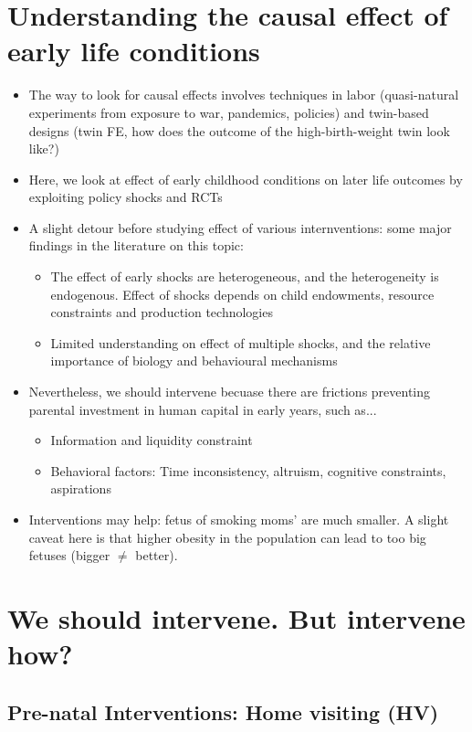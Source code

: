 \section{Understanding the causal effect of early life conditions}
\begin{itemize}
    \item The way to look for causal effects involves techniques in labor (quasi-natural experiments from exposure to war, pandemics, policies) and twin-based designs (twin FE, how does the outcome of the high-birth-weight twin look like?)
    \item Here, we look at effect of early childhood conditions on later life outcomes by  exploiting policy shocks and RCTs
    \item A slight detour before studying effect of various internventions: some major findings in the literature on this topic:
    \begin{itemize}
        \item The effect of early shocks are heterogeneous, and the heterogeneity is endogenous. Effect of shocks depends on child endowments, resource constraints and production technologies
        \item Limited understanding on effect of multiple shocks, and the relative importance of biology and behavioural mechanisms
    \end{itemize}
    \item Nevertheless, we should intervene becuase there are frictions preventing parental investment in human capital in early years, such as...
    \begin{itemize}
        \item Information and liquidity constraint
        \item Behavioral factors: Time inconsistency, altruism, cognitive constraints, aspirations
    \end{itemize}
    \item Interventions may help: fetus of smoking moms' are much smaller. A slight caveat here is that higher obesity in the population can lead to too big fetuses (bigger $\neq$ better).
\end{itemize}
\section{We should intervene. But intervene how?}
\subsection{Pre-natal Interventions: Home visiting (HV)}
